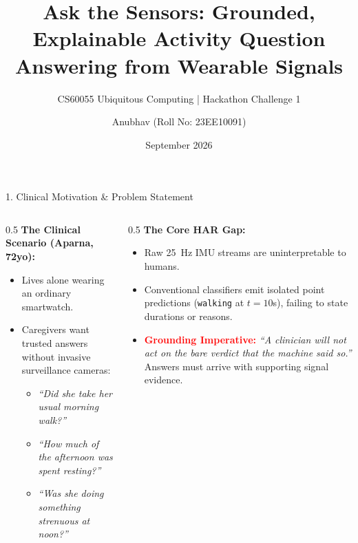 \documentclass[aspectratio=169]{beamer}
\title[Ask the Sensors]{Ask the Sensors: Grounded, Explainable Activity Question Answering from Wearable Signals}
\subtitle{CS60055 Ubiquitous Computing | Hackathon Challenge 1}
\author[Anubhav]{Anubhav (Roll No: 23EE10091)}
\institute[IIT Kharagpur]{Department of Computer Science and Engineering\\Indian Institute of Technology Kharagpur}
\date{September 2026}
\begin{document}
\frame{\titlepage}

\begin{frame}{1. Clinical Motivation \& Problem Statement}
\begin{columns}
\begin{column}{0.5\textwidth}
\textbf{The Clinical Scenario (Aparna, 72yo):}
\begin{itemize}
    \item Lives alone wearing an ordinary smartwatch.
    \item Caregivers want trusted answers without invasive surveillance cameras:
    \begin{itemize}
        \item \textit{``Did she take her usual morning walk?''}
        \item \textit{``How much of the afternoon was spent resting?''}
        \item \textit{``Was she doing something strenuous at noon?''}
    \end{itemize}
\end{itemize}
\end{column}
\begin{column}{0.5\textwidth}
\textbf{The Core HAR Gap:}
\begin{itemize}
    \item Raw 25~Hz IMU streams are uninterpretable to humans.
    \item Conventional classifiers emit isolated point predictions (\texttt{walking} at $t=10$s), failing to state durations or reasons.
    \item \textcolor{red}{\textbf{Grounding Imperative:}} \textit{``A clinician will not act on the bare verdict that the machine said so.''} Answers must arrive with supporting signal evidence.
\end{itemize}
\end{column}
\end{columns}
\end{frame}
\end{document}
